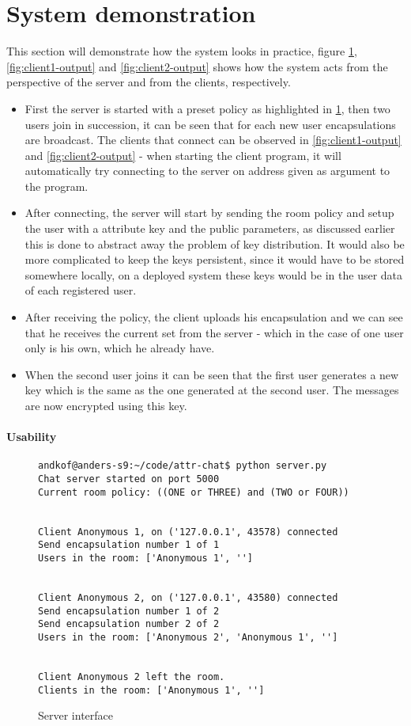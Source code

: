 \section{System demonstration}
This section will demonstrate how the system looks in practice, figure \ref{fig:server-output}, \ref{fig:client1-output} and \ref{fig:client2-output} shows how the system acts from the perspective of the server and from the clients, respectively. 
\begin{itemize}
\item First the server is started with a preset policy as highlighted in \ref{fig:server-output}, then two users join in succession, it can be seen that for each new user encapsulations are broadcast. The clients that connect can be observed in \ref{fig:client1-output} and \ref{fig:client2-output}  - when starting the client program, it will automatically try connecting to the server on address given as argument to the program. 
\item After connecting, the server will start by sending the room policy and setup the user with a attribute key and the public parameters, as discussed earlier this is done to abstract away the problem of key distribution. It would also be more complicated to keep the keys persistent, since it would have to be stored somewhere locally, on a deployed system these keys would be in the user data of each registered user. 
\item After receiving the policy, the client uploads his encapsulation and we can see that he receives the current set from the server - which in the case of one user only is his own, which he already have. 
\item When the second user joins it can be seen that the first user generates a new key which is the same as the one generated at the second user. The messages are now encrypted using this key.
\end{itemize}

\paragraph{Usability}


\begin{figure}
\centering
\begin{lstlisting}[breaklines=true, backgroundcolor=\color{mygray} ]
andkof@anders-s9:~/code/attr-chat$ python server.py 
Chat server started on port 5000
Current room policy: ((ONE or THREE) and (TWO or FOUR))


Client Anonymous 1, on ('127.0.0.1', 43578) connected
Send encapsulation number 1 of 1
Users in the room: ['Anonymous 1', '']


Client Anonymous 2, on ('127.0.0.1', 43580) connected
Send encapsulation number 1 of 2
Send encapsulation number 2 of 2
Users in the room: ['Anonymous 2', 'Anonymous 1', '']


Client Anonymous 2 left the room.
Clients in the room: ['Anonymous 1', '']

\end{lstlisting}
\caption{Server interface}
\label{fig:server-output}
\end{figure}



